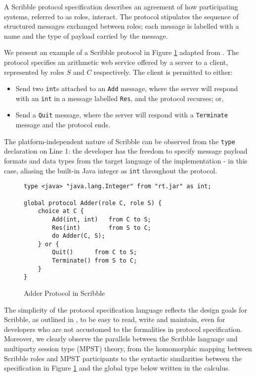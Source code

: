 A Scribble protocol specification describes an agreement of how participating systems, referred to as {roles}, interact. The protocol stipulates the sequence of structured messages exchanged between roles; each message is labelled with a name and the type of payload carried by the message.

We present an example of a Scribble protocol in Figure \ref{fig:adder_scr} adapted from \cite{Hybrid2016}. The protocol specifies an arithmetic web service offered by a server to a client, represented by roles $S$ and $C$ respectively. The client is permitted to either:

\begin{itemize}
\item Send two \texttt{int}s attached to an \texttt{Add} message, where the server will respond with an \texttt{int} in a message labelled \texttt{Res}, and the protocol recurses; or,
\item Send a \texttt{Quit} message, where the server will respond with a \texttt{Terminate} message and the protocol ends.
\end{itemize}

The platform-independent nature of Scribble can be observed from the \texttt{type} declaration on Line 1: the developer has the freedom to specify message payload formats and data types from the target language of the implementation - in this case, aliasing the built-in Java integer as \texttt{int} throughout the protocol.

\begin{figure}[!h]
\begin{lstlisting}[language=Scribble]
type <java> "java.lang.Integer" from "rt.jar" as int;

global protocol Adder(role C, role S) {
	choice at C {
		Add(int, int)	from C to S;
		Res(int)		from S to C;
		do Adder(C, S);
	} or {
		Quit()		from C to S;
		Terminate()	from S to C;	
	}
}
\end{lstlisting}
\caption{Adder Protocol in Scribble}
\label{fig:adder_scr}
\end{figure}

The simplicity of the protocol specification language reflects the design goals for Scribble, as outlined in \cite{Scribble}, to be easy to read, write and maintain, even for developers who are not accustomed to the formalities in protocol specification. Moreover, we clearly observe the parallels between the Scribble language and multiparty session type (MPST) theory, from the homomorphic mapping between Scribble roles and MPST participants to the syntactic similarities between the specification in Figure \ref{fig:adder_scr} and the global type below written in the calculus.

